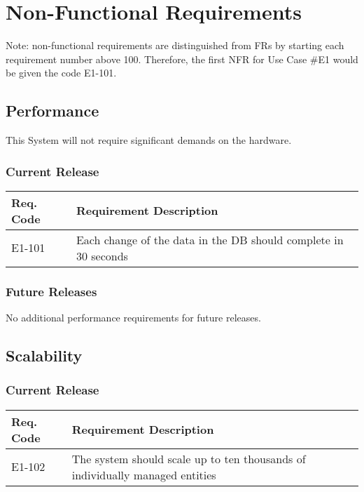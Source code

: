 \documentclass[12pt]{article}
\begin{document}
\section{Non-Functional Requirements}
Note: non-functional requirements are distinguished from FRs by starting each requirement number above 100. Therefore, the first 
NFR for Use Case \#E1 would be given the code E1-101.

\subsection{Performance}
This System will not require significant demands on the hardware.

\subsubsection{Current Release}

\begin{center}
	\begin{tabular}{| p{2.5cm} | p{12.5cm} |}
		\hline
		\textbf{Req. Code} & \textbf{Requirement Description}\\
		\hline
		E1-101	& Each change of the data in the DB should complete in 30 seconds\\
		\hline
	\end{tabular}
	\label{tab:PerformanceRequirements}
\end{center}

\subsubsection{Future Releases}
No additional performance requirements for future releases.


\subsection{Scalability}

\subsubsection{Current Release}

\begin{center}
	\begin{tabular}{| p{2.5cm} | p{12.5cm} |}
		\hline
		\textbf{Req. Code} & \textbf{Requirement Description}\\
		\hline
		E1-102	& The system should scale up to ten thousands of individually managed entities\\
		\hline
	\end{tabular}
	\label{tab:ScalabilityRequirements}
\end{center}
\end{document}

